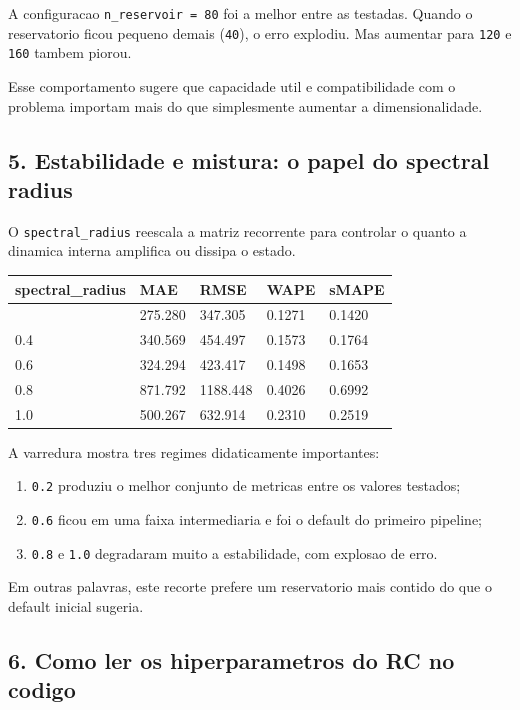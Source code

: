 \documentclass[12pt]{article}
\providecommand{\tightlist}{%
          \setlength{\itemsep}{0pt}\setlength{\parskip}{0pt}}
\begin{document}
A configuracao \texttt{n\_reservoir\ =\ 80} foi a melhor entre as testadas. Quando o reservatorio ficou pequeno demais (\texttt{40}), o erro explodiu. Mas aumentar para \texttt{120} e \texttt{160} tambem piorou.

Esse comportamento sugere que capacidade util e compatibilidade com o problema importam mais do que simplesmente aumentar a dimensionalidade.

\subsection{5. Estabilidade e mistura: o papel do spectral radius}\label{5-estabilidade-e-mistura-o-papel-do-spectral-radius}

O \texttt{spectral\_radius} reescala a matriz recorrente para controlar o quanto a dinamica interna amplifica ou dissipa o estado.

\begin{longtable}[]{@{}lllll@{}}
\toprule\noalign{}
spectral\_radius & MAE & RMSE & WAPE & sMAPE \\
\midrule\noalign{}
\endhead
\bottomrule\noalign{}
\endlastfoot
0.2 & 275.280 & 347.305 & 0.1271 & 0.1420 \\
0.4 & 340.569 & 454.497 & 0.1573 & 0.1764 \\
0.6 & 324.294 & 423.417 & 0.1498 & 0.1653 \\
0.8 & 871.792 & 1188.448 & 0.4026 & 0.6992 \\
1.0 & 500.267 & 632.914 & 0.2310 & 0.2519 \\
\end{longtable}

A varredura mostra tres regimes didaticamente importantes:

\begin{enumerate}
\def\labelenumi{\arabic{enumi}.}
\tightlist
\item
  \texttt{0.2} produziu o melhor conjunto de metricas entre os valores testados;
\item
  \texttt{0.6} ficou em uma faixa intermediaria e foi o default do primeiro pipeline;
\item
  \texttt{0.8} e \texttt{1.0} degradaram muito a estabilidade, com explosao de erro.
\end{enumerate}

Em outras palavras, este recorte prefere um reservatorio mais contido do que o default inicial sugeria.

\subsection{6. Como ler os hiperparametros do RC no codigo}\label{6-como-ler-os-hiperparametros-do-rc-no-codigo}
\end{document}
